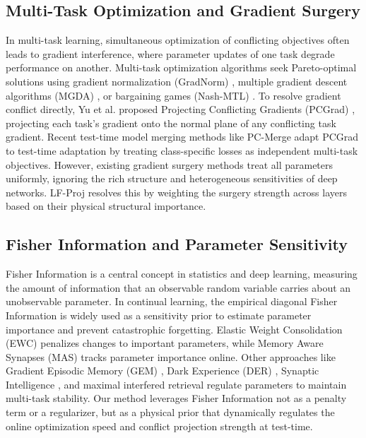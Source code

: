 \documentclass{article}
\theoremstyle{plain}
\theoremstyle{definition}
\theoremstyle{remark}
\begin{document}
\subsection{Multi-Task Optimization and Gradient Surgery}
In multi-task learning, simultaneous optimization of conflicting objectives often leads to gradient interference, where parameter updates of one task degrade performance on another. Multi-task optimization algorithms seek Pareto-optimal solutions using gradient normalization (GradNorm) \cite{gradnorm}, multiple gradient descent algorithms (MGDA) \cite{mgda}, or bargaining games (Nash-MTL) \cite{nash_mtl, imtl, famo}. To resolve gradient conflict directly, Yu et al. \cite{pcgrad} proposed Projecting Conflicting Gradients (PCGrad) \cite{pcgrad}, projecting each task's gradient onto the normal plane of any conflicting task gradient. Recent test-time model merging methods like PC-Merge \cite{pc_merge} adapt PCGrad to test-time adaptation by treating class-specific losses as independent multi-task objectives. However, existing gradient surgery methods treat all parameters uniformly, ignoring the rich structure and heterogeneous sensitivities of deep networks. LF-Proj resolves this by weighting the surgery strength across layers based on their physical structural importance.

\subsection{Fisher Information and Parameter Sensitivity}
Fisher Information is a central concept in statistics and deep learning, measuring the amount of information that an observable random variable carries about an unobservable parameter. In continual learning, the empirical diagonal Fisher Information is widely used as a sensitivity prior to estimate parameter importance and prevent catastrophic forgetting. Elastic Weight Consolidation (EWC) \cite{ewc, online_ewc} penalizes changes to important parameters, while Memory Aware Synapses (MAS) \cite{mas} tracks parameter importance online. Other approaches like Gradient Episodic Memory (GEM) \cite{gem, agem}, Dark Experience (DER) \cite{der}, Synaptic Intelligence \cite{synaptic_intelligence}, and maximal interfered retrieval \cite{mir} regulate parameters to maintain multi-task stability. Our method leverages Fisher Information not as a penalty term or a regularizer, but as a physical prior that dynamically regulates the online optimization speed and conflict projection strength at test-time.
\end{document}
